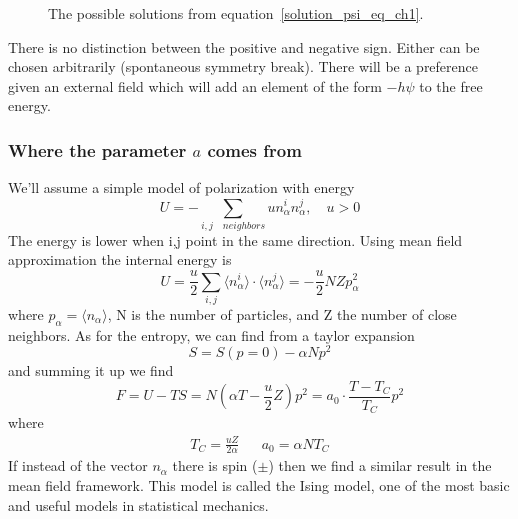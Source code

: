 \begin{figure}[!htb]
	\centering
	\caption{The possible solutions from equation~\ref{solution_psi_eq_ch1}.}
\end{figure}
There is no distinction between the positive and negative sign. Either can be chosen arbitrarily (spontaneous symmetry break). There will be a preference given an external field which will add an element of the form \(-h\psi \) to the free energy.
\newpage
\subsubsection{Where the parameter \(a\) comes from}
We'll assume a simple model of polarization with energy 
\begin{equation}
	U=-\sum\limits_{i,j \quad neighbors}u n_\alpha^i n_\alpha^j,\quad u>0
\end{equation}
The energy is lower when i,j point in the same direction. Using mean field approximation the internal energy is
\begin{equation}
	U=\frac{u}{2}\sum\limits_{i,j}\langle n_\alpha^i\rangle\cdot\langle n_\alpha^j\rangle = -\frac{u}{2}NZp_\alpha^2
\end{equation}
where \(p_\alpha=\langle n_\alpha\rangle \), N is the number of particles, and Z the number of close neighbors. As for the entropy, we can find from a taylor expansion
\begin{equation}
	S=S(p=0)-\alpha Np^2
\end{equation}
and summing it up we find
\begin{equation}
	F=U-TS=N\left(\alpha T-\frac{u}{2}Z\right)p^2=a_0\cdot\frac{T-T_C}{T_C}p^2
\end{equation}
where 
\begin{align}
	T_C=\frac{uZ}{2\alpha} && a_0=\alpha NT_C
\end{align}
If instead of the vector \(n_\alpha \) there is spin (\(\pm \)) then we find a similar result in the mean field framework. This model is called the Ising model, one of the most basic and useful models in statistical mechanics.
